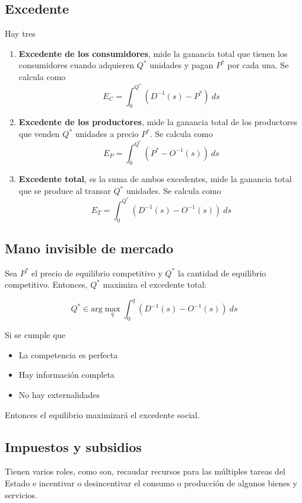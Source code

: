 \subsection{Excedente}

Hay tres 

\begin{enumerate}[label=\Roman*.]
    \item \textbf{Excedente de los consumidores}, mide la ganancia total que tienen los consumidores cuando adquieren $Q^*$ unidades y pagan $P^*$ por cada una. Se calcula como
    \[E_C=\int_0^{Q^*}(D^{-1}(s)-P^*)\ ds\]
    
    \item \textbf{Excedente de los productores}, mide la ganancia total de los productores que venden $Q^*$ unidades a precio $P^*$. Se calcula como
    \[E_P=\int_0^{Q^*}(P^*-O^{-1}(s))\ ds\]
    
    \item \textbf{Excedente total}, es la suma de ambos excedentes, mide la ganancia total que se produce al transar $Q^*$ unidades. Se calcula como
    \[E_T=\int_0^{Q^*}(D^{-1}(s) - O^{-1}(s))\ ds\]
\end{enumerate}

\subsection{Mano invisible de mercado}

Sea $P^*$ el precio de equilibrio competitivo y $Q^*$ la cantidad de equilibrio competitivo. Entonces, $Q^*$ maximiza el excedente total:

\[Q^* \in \mathrm{arg}\max_{q}\int_{0}^q(D^{-1}(s) - O^{-1}(s))\ ds\]

Si se cumple que 
\begin{itemize}
    \item La competencia es perfecta
    \item Hay información completa
    \item No hay externalidades
\end{itemize}

Entonces el equilibrio maximizará el excedente social.

\subsection{Impuestos y subsidios}

Tienen varios roles, como son, recaudar recursos para las múltiples tareas del Estado e incentivar o desincentivar el consumo o producción de algunos bienes y servicios.\\

